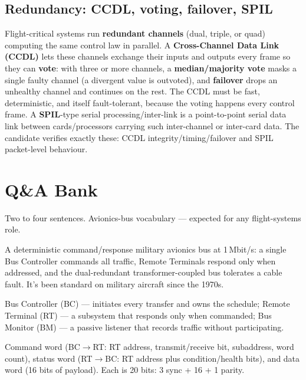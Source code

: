 \subsection{Redundancy: CCDL, voting, failover, SPIL}

Flight-critical systems run \textbf{redundant channels} (dual, triple, or quad)
computing the same control law in parallel. A \textbf{Cross-Channel Data Link
(CCDL)} lets these channels exchange their inputs and outputs every frame so
they can \textbf{vote}: with three or more channels, a \textbf{median/majority
vote} masks a single faulty channel (a divergent value is outvoted), and
\textbf{failover} drops an unhealthy channel and continues on the rest. The CCDL
must be fast, deterministic, and itself fault-tolerant, because the voting
happens every control frame. A \textbf{SPIL}-type serial processing/inter-link
is a point-to-point serial data link between cards/processors carrying such
inter-channel or inter-card data. The candidate verifies exactly these:
CCDL integrity/timing/failover and SPIL packet-level behaviour.

\section{Q\&A Bank}

%
{Two to four sentences. Avionics-bus vocabulary --- expected for any
flight-systems role.}

A deterministic command/response military avionics bus at 1\,Mbit/s: a single
Bus Controller commands all traffic, Remote Terminals respond only when
addressed, and the dual-redundant transformer-coupled bus tolerates a cable
fault. It's been standard on military aircraft since the 1970s.

Bus Controller (BC) --- initiates every transfer and owns the schedule; Remote
Terminal (RT) --- a subsystem that responds only when commanded; Bus Monitor
(BM) --- a passive listener that records traffic without participating.

Command word (BC$\rightarrow$RT: RT address, transmit/receive bit, subaddress,
word count), status word (RT$\rightarrow$BC: RT address plus condition/health
bits), and data word (16 bits of payload). Each is 20 bits: 3 sync + 16 + 1
parity.


